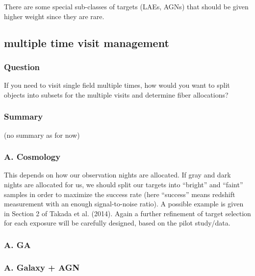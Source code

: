 \documentclass[a4paper,notitlepage]{article}
\begin{document}
There are some special sub-classes of targets (LAEs, AGNs) that should
be given higher weight since they are rare.


\subsection{multiple time visit management}

\subsubsection{Question}
If you need to visit single field multiple times, how
           would you want to split objects into subsets for the
           multiple visits and determine fiber allocations?

\subsubsection{Summary}

(no summary as for now)

\subsubsection{A. Cosmology}
This depends on how our observation nights are allocated. If gray
and dark nights are allocated for us, we should split our targets into
“bright” and “faint” samples in order to maximize the success rate
(here “success” means redshift measurement with an enough
signal-to-noise ratio). A possible example is given in Section 2 of
Takada et al. (2014). Again a further refinement of target selection
for each exposure will be carefully designed, based on the pilot
study/data.

\subsubsection{A. GA}

\subsubsection{A. Galaxy + AGN}


\end{document}

